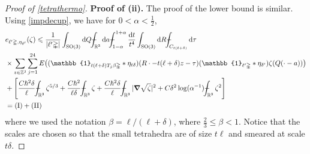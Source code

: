 \documentclass[10pt,a4paper]{amsart}
\newcommand{\RR}{\mathbb{R}}
\newcommand{\SO}{\mathrm{SO}}
\def\XXint#1#2#3{{\setbox0=\hbox{$#1{#2#3}{\int}$ }
\vcenter{\hbox{$#2#3$ }}\kern-.6\wd0}}
\def\Xint#1{\mathchoice
{\XXint\displaystyle\textstyle{#1}}%
{\XXint\textstyle\scriptstyle{#1}}%
{\XXint\scriptstyle\scriptscriptstyle{#1}}%
{\XXint\scriptscriptstyle\scriptscriptstyle{#1}}%
\!\int}
\newcommand{\ZZ}{\mathbb{Z}}
\def\dashint{\Xint-}
\newcommand{\dd}{\mathrm{d}} %
\newcommand{\grad}{\bm{\nabla}} %
\newcommand{\iden}{\mathbb{1}} %
\renewcommand{\le}{\leqslant}
\newcommand{\tetra}{\mathbb{\Delta}} %
\begin{document}
\begin{proof}[Proof of \cref{tetrathermo}]
\vspace{.3em}
\noindent\textbf{Proof of (ii).} The proof of the lower bound is similar. Using \cref{impdecup}, we have for $0<\alpha<\frac{1}{2}$, 
\begin{equation}\label{etetraup}
\begin{aligned}
&e_{\ell'\tetra,\eta_{\delta'}}(\zeta)\le\frac{1}{|\ell'\tetra|}\int_{\SO(3)}\dd Q \dashint_{\RR^3}\dd a \dashint_{1-\alpha}^{1+\alpha}\frac{\dd t}{t^4} \int_{\SO(3)}\dd R 
\dashint_{C_{t(\ell+\delta)}}\dd\tau\\
	&\times \sum_{z\in\ZZ^3} \sum_{j=1}^{24} E\bigl((\iden_{t(\ell+\delta) T_j \beta\tetra} * \eta_{t \delta})(R\cdot - t(\ell+\delta) z - \tau)(\iden_{\ell'\tetra}*\eta_{\delta'})\zeta(Q(\cdot - a))\bigr)\\
	&+\Biggl[\frac{C\hbar^2\delta}{\ell} \dashint_{\RR^3}\zeta^{5/3} +  \frac{C\hbar^2}{\ell\delta} \dashint_{\RR^3} \zeta + \frac{C\hbar^2\delta}{\ell}\dashint_{\RR^3} |\grad\sqrt{\zeta}|^2 + C\delta^2\log(\alpha^{-1}) \dashint_{\RR^3}\zeta^2\Biggr]\\
    &=\mathrm{(I)} + \mathrm{(II)}
\end{aligned}
\end{equation}
where we used the notation $\beta=\ell/(\ell+\delta)$, where $\frac{2}{3}\le\beta<1$. Notice that the scales are chosen so that the small tetrahedra are of size $t\ell$ and smeared at scale $t\delta$.


\end{proof}
\end{document}
